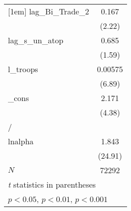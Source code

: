 {\begin{tabular}{l*{1}{c}}
[1em]
lag\_Bi\_Trade\_2&       0.167\sym{*}  \\
            &      (2.22)         \\
[1em]
lag\_s\_un\_atop&       0.685         \\
            &      (1.59)         \\
[1em]
l\_troops    &     0.00575\sym{***}\\
            &      (6.89)         \\
[1em]
\_cons      &       2.171\sym{***}\\
            &      (4.38)         \\
\hline
/           &                     \\
lnalpha     &       1.843\sym{***}\\
            &     (24.91)         \\
\hline
\(N\)       &       72292         \\
\hline\hline
\multicolumn{2}{l}{\footnotesize \textit{t} statistics in parentheses}\\
\multicolumn{2}{l}{\footnotesize \sym{*} \(p<0.05\), \sym{**} \(p<0.01\), \sym{***} \(p<0.001\)}\\
\end{tabular}
}
